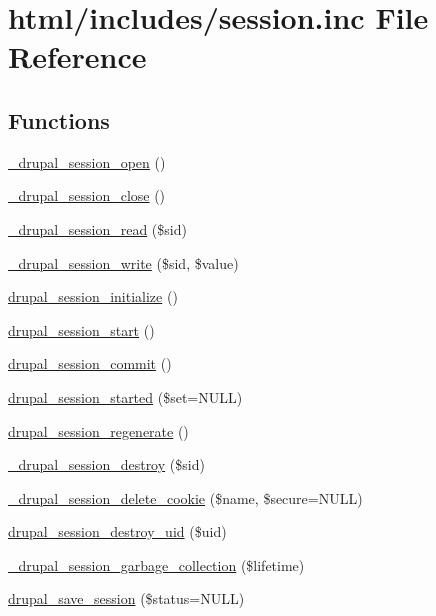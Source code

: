 \hypertarget{session_8inc}{
\section{html/includes/session.inc File Reference}
\label{session_8inc}
}
\subsection*{Functions}
\begin{DoxyCompactItemize}
\item 
\hyperlink{session_8inc_ac8852f85f169dfbee885d44239a6048c}{\_\-drupal\_\-session\_\-open} ()
\item 
\hyperlink{session_8inc_a442fb2eb576d761183c100cdd1c078fd}{\_\-drupal\_\-session\_\-close} ()
\item 
\hyperlink{session_8inc_aeb991b6399401804bd0072e5ee6e4741}{\_\-drupal\_\-session\_\-read} (\$sid)
\item 
\hyperlink{session_8inc_a4c7b4bd789e8a27c6c7078cb1a32f8f9}{\_\-drupal\_\-session\_\-write} (\$sid, \$value)
\item 
\hyperlink{session_8inc_a1ddf625160ae9e448b25ea74f9fa58d0}{drupal\_\-session\_\-initialize} ()
\item 
\hyperlink{group__php__wrappers_gaef664546ab6308e639e0d6f6b363ae57}{drupal\_\-session\_\-start} ()
\item 
\hyperlink{session_8inc_ad6c0ee8cae83649ccfbc7f2eef268377}{drupal\_\-session\_\-commit} ()
\item 
\hyperlink{session_8inc_a4de15350e0f9d1786d59da6ea7ea7171}{drupal\_\-session\_\-started} (\$set=NULL)
\item 
\hyperlink{group__php__wrappers_ga144f983d31722d56cef8cdf259d2f68f}{drupal\_\-session\_\-regenerate} ()
\item 
\hyperlink{session_8inc_af8a3df8c027292c59745d5ce00025480}{\_\-drupal\_\-session\_\-destroy} (\$sid)
\item 
\hyperlink{session_8inc_a8e37ac914709ebe5fd2a90a05ef9d07d}{\_\-drupal\_\-session\_\-delete\_\-cookie} (\$name, \$secure=NULL)
\item 
\hyperlink{session_8inc_a5ac41504673ec444e5e2d1aa1dc231f8}{drupal\_\-session\_\-destroy\_\-uid} (\$uid)
\item 
\hyperlink{session_8inc_a27392dffc0efaa15d678b516379eec99}{\_\-drupal\_\-session\_\-garbage\_\-collection} (\$lifetime)
\item 
\hyperlink{session_8inc_a2e1c6443b96a7018027383ca39585ce7}{drupal\_\-save\_\-session} (\$status=NULL)
\end{DoxyCompactItemize}


